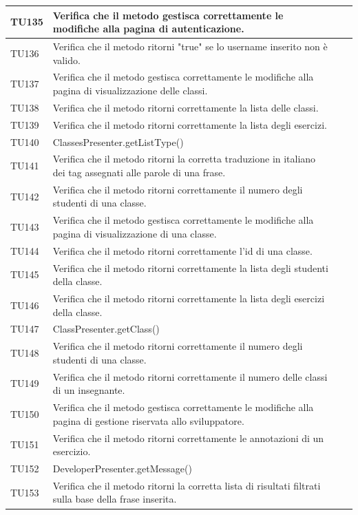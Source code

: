 \begin{longtable}{|>{\centering\arraybackslash}m{1.6cm}|>{\centering\arraybackslash}m{6.41cm}|>{\centering\arraybackslash}m{3.1cm}| c |}
		TU135 & Verifica che il metodo gestisca correttamente le modifiche alla pagina di autenticazione. \\ \hline
		TU136 & Verifica che il metodo ritorni "true" se lo username inserito non è valido. \\ \hline
		TU137 & Verifica che il metodo gestisca correttamente le modifiche alla pagina di visualizzazione delle classi. \\ \hline
		TU138 & Verifica che il metodo ritorni correttamente la lista delle classi. \\ \hline
		TU139 & Verifica che il metodo ritorni correttamente la lista degli esercizi. \\ \hline
		TU140 & ClassesPresenter.getListType()\\ \hline
		TU141 & Verifica che il metodo ritorni la corretta traduzione in italiano dei tag assegnati alle parole di una frase. \\ \hline
		TU142 & Verifica che il metodo ritorni correttamente il numero degli studenti di una classe. \\ \hline
		TU143 & Verifica che il metodo gestisca correttamente le modifiche alla pagina di visualizzazione di una classe. \\ \hline
		TU144 & Verifica che il metodo ritorni correttamente l'id di una classe. \\ \hline
		TU145 & Verifica che il metodo ritorni correttamente la lista degli studenti della classe.\\ \hline
		TU146 & Verifica che il metodo ritorni correttamente la lista degli esercizi della classe. \\ \hline
		TU147 & ClassPresenter.getClass()\\ \hline
		TU148 & Verifica che il metodo ritorni correttamente il numero degli studenti di una classe. \\ \hline
		TU149 & Verifica che il metodo ritorni correttamente il numero delle classi di un insegnante.\\ \hline
		TU150 & Verifica che il metodo gestisca correttamente le modifiche alla pagina di gestione riservata allo sviluppatore. \\ \hline
		TU151 & Verifica che il metodo ritorni correttamente le annotazioni di un esercizio.\\ \hline
		TU152 & DeveloperPresenter.getMessage()\\ \hline
		TU153 & Verifica che il metodo ritorni la corretta lista di risultati filtrati sulla base della frase inserita. \\ \hline

\end{longtable}
